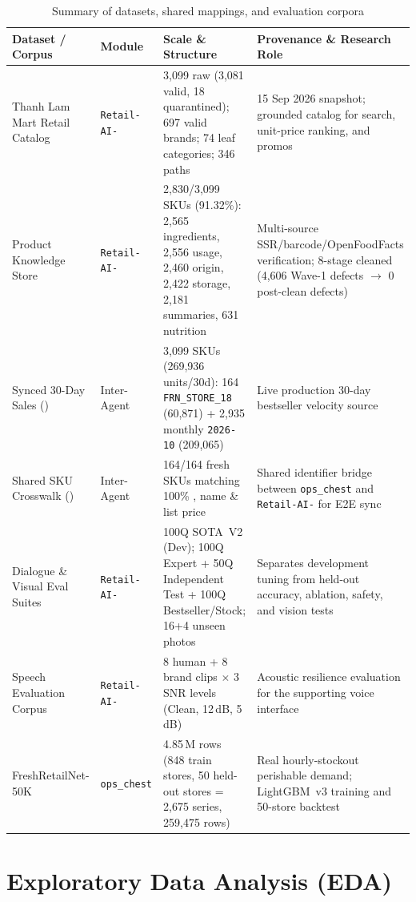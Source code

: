 \begin{table}[H]
\centering
\caption{Summary of datasets, shared mappings, and evaluation corpora}
\label{tab:dataset_stats}
\footnotesize
\begin{tabularx}{\textwidth}{L{3.5cm} L{2.1cm} L{3.8cm} Y}
\toprule
\textbf{Dataset / Corpus} & \textbf{Module} & \textbf{Scale \& Structure} & \textbf{Provenance \& Research Role} \\
\midrule
Thanh Lam Mart Retail Catalog & \texttt{Retail-AI-} & 3,099 raw (3,081 valid, 18 quarantined); 697 valid brands; 74 leaf categories; 346 paths & 15 Sep 2026 snapshot; grounded catalog for search, unit-price ranking, and promos \\
Product Knowledge Store & \texttt{Retail-AI-} & 2,830/3,099 SKUs (91.32\%): 2,565 ingredients, 2,556 usage, 2,460 origin, 2,422 storage, 2,181 summaries, 631 nutrition & Multi-source SSR/barcode/OpenFoodFacts verification; 8-stage cleaned (4,606 Wave-1 defects $\to$ 0 post-clean defects) \\
Synced 30-Day Sales () & Inter-Agent & 3,099 SKUs (269,936 units/30d): 164 \texttt{FRN\_STORE\_18} (60,871) + 2,935 monthly \texttt{2026-10} (209,065) & Live production 30-day bestseller velocity source \\
Shared SKU Crosswalk () & Inter-Agent & 164/164 fresh SKUs matching 100\% , name \& list price & Shared identifier bridge between \texttt{ops\_chest} and \texttt{Retail-AI-} for E2E sync \\
Dialogue \& Visual Eval Suites & \texttt{Retail-AI-} & 100Q SOTA~V2 (Dev); 100Q Expert + 50Q Independent Test + 100Q Bestseller/Stock; 16+4 unseen photos & Separates development tuning from held-out accuracy, ablation, safety, and vision tests \\
Speech Evaluation Corpus & \texttt{Retail-AI-} & 8 human + 8 brand clips $\times$ 3 SNR levels (Clean, 12\,dB, 5\,dB) & Acoustic resilience evaluation for the supporting voice interface \\
FreshRetailNet-50K~\cite{freshretailnet50k} & \texttt{ops\_chest} & 4.85\,M rows (848 train stores, 50 held-out stores = 2,675 series, 259,475 rows) & Real hourly-stockout perishable demand; LightGBM~v3 training and 50-store backtest \\
\bottomrule
\end{tabularx}
\end{table}

\section{Exploratory Data Analysis (EDA)}


